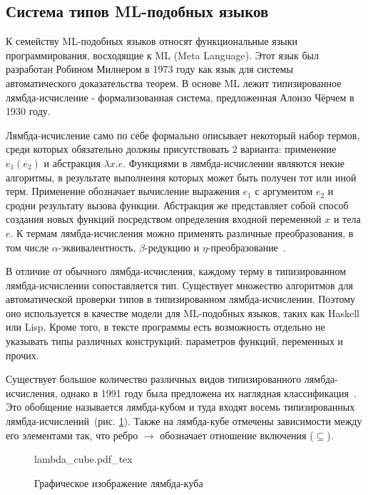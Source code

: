 \subsection{Система типов ML-подобных языков}
\label{subsec:ml_type_system}


К семейству ML-подобных языков относят функциональные языки программирования, восходящие к ML (Meta Language).
Этот язык был разработан Робином Милнером в 1973 году как язык для системы автоматического доказательства теорем.
В основе ML лежит типизированное лямбда-исчисление - формализованная система, предложенная Алонзо Чёрчем в 1930 году.

Лямбда-исчисление само по себе формально описывает некоторый набор термов, среди которых обязательно должны присутствовать 2 варианта: применение $e_1(e_2)$ и абстракция $\lambda x. e$.
Функциями в лямбда-исчислении являются некие алгоритмы, в результате выполнения которых может быть получен тот или иной терм.
Применение обозначает вычисление выражения $e_1$ с аргументом $e_2$ и сродни результату вызова функции.
Абстракция же представляет собой способ создания новых функций посредством определения входной переменной $x$ и тела $e$.
К термам лямбда-исчисления можно применять различные преобразования, в том числе $\alpha$-эквивалентность, $\beta$-редукцию и $\eta$-преобразование~\cite{LambdaCalculus}.

В отличие от обычного лямбда-исчисления, каждому терму в типизированном лямбда-исчислении сопоставляется тип.
Существует множество алгоритмов для автоматической проверки типов в типизированном лямбда-исчислении.
Поэтому оно используется в качестве модели для ML-подобных языков, таких как Haskell или Lisp.
Кроме того, в тексте программы есть возможность отдельно не указывать типы различных конструкций: параметров функций, переменных и прочих.

Существует большое количество различных видов типизированного лямбда-исчисления, однако в 1991 году была предложена их наглядная классификация~\cite{LambdaCalculusWithTypes}.
Это обобщение называется лямбда-кубом и туда входят восемь типизированных лямбда-исчислений~(рис. \ref{fig:lambda_cube}).
Также на лямбда-кубе отмечены зависимости между его элементами так, что ребро $\to$ обозначает отношение включения ($\subseteq$).

\begin{figure}[H]
    \centering
    {lambda_cube.pdf_tex}
    \caption{Графическое изображение лямбда-куба}
    \label{fig:lambda_cube}
\end{figure}

